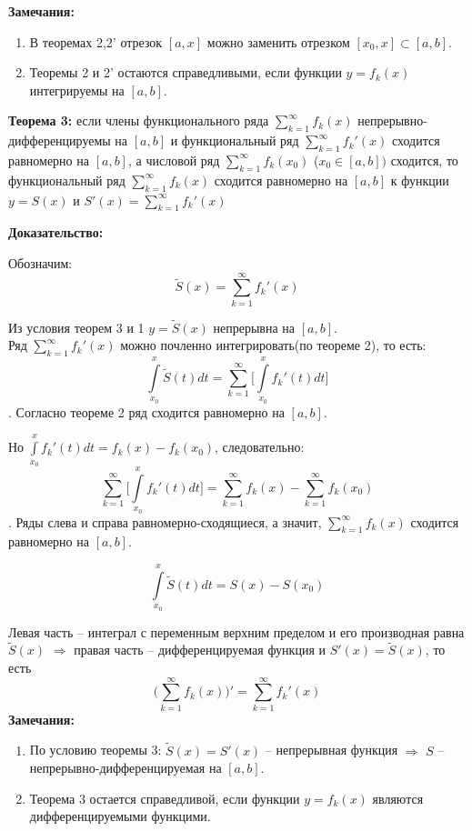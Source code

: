 \documentclass[a4paper,12pt]{article} %
\begin{document}
\noindent \textbf{Замечания:}
\begin{enumerate}
    \item В теоремах 2,2' отрезок $[a,x]$ можно заменить отрезком $[x_0,x] \subset [a,b].$
    
    \item Теоремы 2 и 2' остаются справедливыми, если функции $y=f_k(x)$ интегрируемы на $[a,b]$.
\end{enumerate}

\noindent \textbf{Теорема 3:} если члены функционального ряда $\sum\limits_{k = 1}^{\infty}  f_k(x)$   непрерывно-дифференцируемы  на $[a,b]$ и функциональный ряд $\sum\limits_{k = 1}^{\infty}  f_k'(x)$ сходится равномерно на $[a,b]$, а числовой ряд $\sum\limits_{k = 1}^{\infty}  f_k(x_0)$ ($x_0 \in [a,b])$ сходится, то функциональный ряд $\sum\limits_{k = 1}^{\infty}  f_k(x)$ сходится равномерно на $[a,b]$ к функции $y = S(x)$ и $S'(x) = \sum\limits_{k = 1}^{\infty}  f_k'(x)$

\noindent \textbf{Доказательство:}

Обозначим: $$\widetilde{S}(x)= \sum_{k = 1}^{\infty}  f_k'(x)$$

Из условия теорем 3 и 1 $y = \widetilde{S}(x)$ непрерывна на $[a,b]$.
\\[5 mm]
Ряд $\sum\limits_{k = 1}^{\infty}  f_k'(x)$ можно почленно интегрировать(по теореме 2), то есть:
\\[5 mm]
$$\int\limits_{x_0}^x \widetilde{S}(t)dt = \sum_{k = 1}^{\infty}  \big[\int\limits_{x_0}^{x}f_k'(t)dt\big]$$. \newline
Согласно теореме 2 ряд сходится равномерно на $[a,b]$. 

Но $\int\limits_{x_0}^{x}f_k'(t)dt = f_k(x)-f_k(x_0)$, следовательно: $$\sum_{k = 1}^{\infty}  \big[\int\limits_{x_0}^{x}f_k'(t)dt\big] = \sum_{k=1}^\infty f_k(x)-\sum_{k=1}^\infty f_k(x_0)$$. \newline
Ряды слева и справа равномерно-сходящиеся, а значит, $\sum\limits_{k=1}^\infty f_k(x)$ сходится равномерно на $[a,b]$.

$$\int\limits_{x_0}^x \widetilde{S}(t)dt = S(x)-S(x_0)$$

Левая часть -- интеграл с переменным верхним пределом и его производная равна $\widetilde{S}(x)$ $\Rightarrow$ правая часть -- дифференцируемая функция и $S'(x) = \widetilde{S}(x)$, то есть 
$$\bigg(\sum_{k = 1}^{\infty}  f_k(x)\bigg)' = \sum_{k = 1}^{\infty}  f_k'(x)$$
\newline
\noindent \textbf{Замечания:}
\begin{enumerate}
    \item По условию теоремы 3: $\widetilde{S}(x) = S'(x)$ -- непрерывная функция $\Rightarrow$ $S$ -- непрерывно-дифференцируемая на $[a,b]$.
    
    \item Теорема 3 остается справедливой, если функции $y=f_k(x)$ являются дифференцируемыми функцими.
\end{enumerate}
\end{document}
